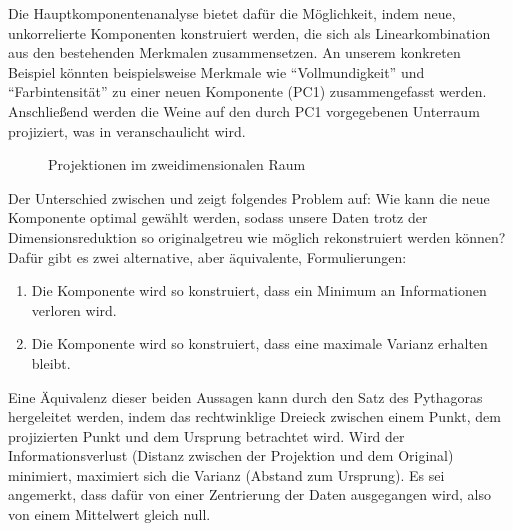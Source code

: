 Die Hauptkomponentenanalyse bietet dafür die Möglichkeit, indem neue, unkorrelierte Komponenten konstruiert werden, die sich als Linearkombination aus den bestehenden Merkmalen zusammensetzen.
An unserem konkreten Beispiel könnten beispielsweise Merkmale wie \enquote{Vollmundigkeit} und \enquote{Farbintensität} zu einer neuen Komponente (PC1) zusammengefasst werden.
Anschließend werden die Weine auf den durch PC1 vorgegebenen Unterraum projiziert, was in  veranschaulicht wird.
\begin{figure}[bt]
    \centering
    \begin{subfigure}{\textwidth}
        \centering
        \caption{}\label{fig:pca2d1}
        
        \hspace{20pt}
        
    \end{subfigure}
    \begin{subfigure}{\textwidth}
        \centering
        \caption{}\label{fig:pca2d2}
        
        \hspace{20pt}
        
    \end{subfigure}
    \caption{Projektionen im zweidimensionalen Raum}\label{fig:pca2d}
\end{figure}

Der Unterschied zwischen  und  zeigt folgendes Problem auf:
Wie kann die neue Komponente optimal gewählt werden, sodass unsere Daten trotz der Dimensionsreduktion so originalgetreu wie möglich rekonstruiert werden können?
Dafür gibt es zwei alternative, aber äquivalente, Formulierungen:
\begin{enumerate}
    \item Die Komponente wird so konstruiert, dass ein Minimum an Informationen verloren wird.
    \item Die Komponente wird so konstruiert, dass eine maximale Varianz erhalten bleibt.
\end{enumerate}
Eine Äquivalenz dieser beiden Aussagen kann durch den Satz des Pythagoras hergeleitet werden, indem das rechtwinklige Dreieck zwischen einem Punkt, dem projizierten Punkt und dem Ursprung betrachtet wird. 
Wird der Informationsverlust (Distanz zwischen der Projektion und dem Original) minimiert, maximiert sich die Varianz (Abstand zum Ursprung).
Es sei angemerkt, dass dafür von einer Zentrierung der Daten ausgegangen wird, also von einem Mittelwert gleich null.

